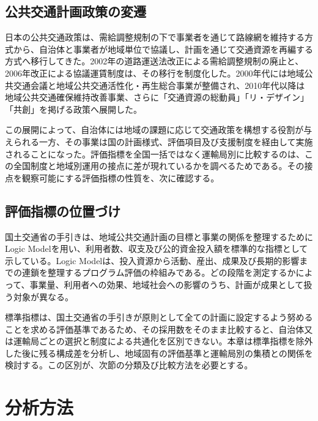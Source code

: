 \subsection{公共交通計画政策の変遷}

日本の公共交通政策は、需給調整規制の下で事業者を通じて路線網を維持する方式から、自治体と事業者が地域単位で協議し、計画を通じて交通資源を再編する方式へ移行してきた。2002年の道路運送法改正による需給調整規制の廃止と、2006年改正による協議運賃制度は、その移行を制度化した\cite{kato2020}。2000年代には地域公共交通会議と地域公共交通活性化・再生総合事業が整備され\cite{mlit2005}、2010年代以降は地域公共交通確保維持改善事業、さらに「交通資源の総動員」「リ・デザイン」「共創」を掲げる政策へ展開した\cite{mlit2012,mlit2020,mlit2023}。

この展開によって、自治体には地域の課題に応じて交通政策を構想する役割が与えられる一方、その事業は国の計画様式、評価項目及び支援制度を経由して実施されることになった。評価指標を全国一括ではなく運輸局別に比較するのは、この全国制度と地域別運用の接点に差が現れているかを調べるためである。その接点を観察可能にする評価指標の性質を、次に確認する。

\subsection{評価指標の位置づけ}

国土交通省の手引きは、地域公共交通計画の目標と事業の関係を整理するためにLogic Modelを用い、利用者数、収支及び公的資金投入額を標準的な指標として示している\cite{mlit2023}。Logic Modelは、投入資源から活動、産出、成果及び長期的影響までの連鎖を整理するプログラム評価の枠組みである\cite{minoru2020,rossi2004}。どの段階を測定するかによって、事業量、利用者への効果、地域社会への影響のうち、計画が成果として扱う対象が異なる。

標準指標は、国土交通省の手引きが原則として全ての計画に設定するよう努めることを求める評価基準であるため、その採用数をそのまま比較すると、自治体又は運輸局ごとの選択と制度による共通化を区別できない。本章は標準指標を除外した後に残る構成差を分析し、地域固有の評価基準と運輸局別の集積との関係を検討する。この区別が、次節の分類及び比較方法を必要とする。

\section{分析方法}
\label{sec:ch6_method}


